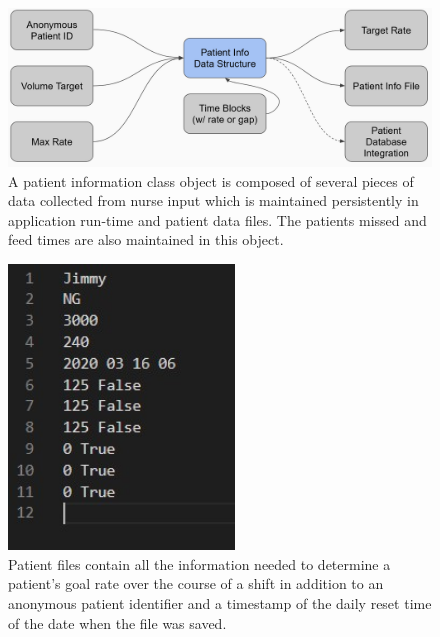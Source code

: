 \documentclass[onecolumn, draftclsnofoot,10pt, compsoc]{IEEEtran}
\begin{document}
\begin{figure}[htp]
    \centering
    \includegraphics[width=17cm]{patientinfo}
    \caption{A patient information class object is composed of several pieces of data collected from nurse input which is maintained persistently in application run-time and patient data files. The patients missed and feed times are also maintained in this object.}
    \label{fig:Patient Info Flowchart}
\end{figure}

\begin{figure}[htp]
    \centering
    \includegraphics[width=6cm]{patientexample}
    \caption{Patient files contain all the information needed to determine a patient's goal rate over the course of a shift in addition to an anonymous patient identifier and a timestamp of the daily reset time of the date when the file was saved.}
    \label{fig:Patient File Example}
\end{figure}
\end{document}
